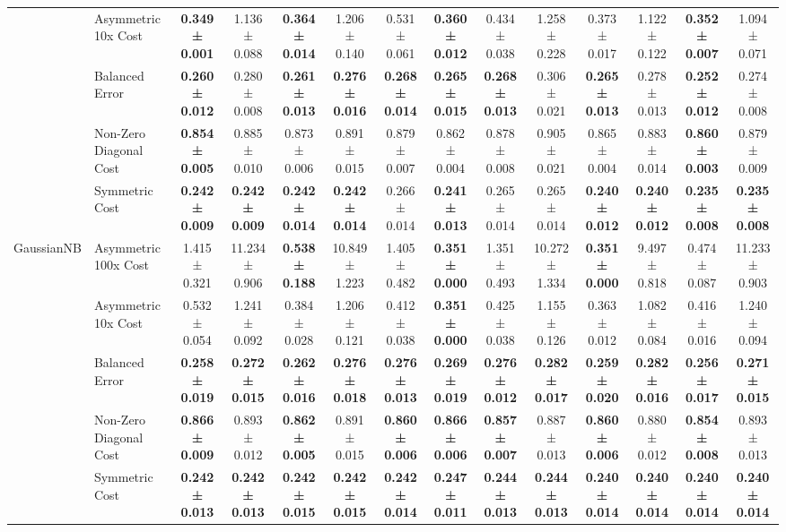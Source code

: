 \begin{table}[H]
{\begin{tabular}{llcccccccccccc}
 & Asymmetric 10x Cost & \textbf{0.349 ± 0.001} & 1.136 ± 0.088 & \textbf{0.364 ± 0.014} & 1.206 ± 0.140 & 0.531 ± 0.061 & \textbf{0.360 ± 0.012} & 0.434 ± 0.038 & 1.258 ± 0.228 & 0.373 ± 0.017 & 1.122 ± 0.122 & \textbf{0.352 ± 0.007} & 1.094 ± 0.071 \\
 & Balanced Error & \textbf{0.260 ± 0.012} & 0.280 ± 0.008 & \textbf{0.261 ± 0.013} & \textbf{0.276 ± 0.016} & \textbf{0.268 ± 0.014} & \textbf{0.265 ± 0.015} & \textbf{0.268 ± 0.013} & 0.306 ± 0.021 & \textbf{0.265 ± 0.013} & 0.278 ± 0.013 & \textbf{0.252 ± 0.012} & 0.274 ± 0.008 \\
 & Non-Zero Diagonal Cost & \textbf{0.854 ± 0.005} & 0.885 ± 0.010 & 0.873 ± 0.006 & 0.891 ± 0.015 & 0.879 ± 0.007 & 0.862 ± 0.004 & 0.878 ± 0.008 & 0.905 ± 0.021 & 0.865 ± 0.004 & 0.883 ± 0.014 & \textbf{0.860 ± 0.003} & 0.879 ± 0.009 \\
 & Symmetric Cost & \textbf{0.242 ± 0.009} & \textbf{0.242 ± 0.009} & \textbf{0.242 ± 0.014} & \textbf{0.242 ± 0.014} & 0.266 ± 0.014 & \textbf{0.241 ± 0.013} & 0.265 ± 0.014 & 0.265 ± 0.014 & \textbf{0.240 ± 0.012} & \textbf{0.240 ± 0.012} & \textbf{0.235 ± 0.008} & \textbf{0.235 ± 0.008} \\
\cline{1-14}
\multirow[t]{5}{*}{GaussianNB} & Asymmetric 100x Cost & 1.415 ± 0.321 & 11.234 ± 0.906 & \textbf{0.538 ± 0.188} & 10.849 ± 1.223 & 1.405 ± 0.482 & \textbf{0.351 ± 0.000} & 1.351 ± 0.493 & 10.272 ± 1.334 & \textbf{0.351 ± 0.000} & 9.497 ± 0.818 & 0.474 ± 0.087 & 11.233 ± 0.903 \\
 & Asymmetric 10x Cost & 0.532 ± 0.054 & 1.241 ± 0.092 & 0.384 ± 0.028 & 1.206 ± 0.121 & 0.412 ± 0.038 & \textbf{0.351 ± 0.000} & 0.425 ± 0.038 & 1.155 ± 0.126 & 0.363 ± 0.012 & 1.082 ± 0.084 & 0.416 ± 0.016 & 1.240 ± 0.094 \\
 & Balanced Error & \textbf{0.258 ± 0.019} & \textbf{0.272 ± 0.015} & \textbf{0.262 ± 0.016} & \textbf{0.276 ± 0.018} & \textbf{0.276 ± 0.013} & \textbf{0.269 ± 0.019} & \textbf{0.276 ± 0.012} & \textbf{0.282 ± 0.017} & \textbf{0.259 ± 0.020} & \textbf{0.282 ± 0.016} & \textbf{0.256 ± 0.017} & \textbf{0.271 ± 0.015} \\
 & Non-Zero Diagonal Cost & \textbf{0.866 ± 0.009} & 0.893 ± 0.012 & \textbf{0.862 ± 0.005} & 0.891 ± 0.015 & \textbf{0.860 ± 0.006} & \textbf{0.866 ± 0.006} & \textbf{0.857 ± 0.007} & 0.887 ± 0.013 & \textbf{0.860 ± 0.006} & 0.880 ± 0.012 & \textbf{0.854 ± 0.008} & 0.893 ± 0.013 \\
 & Symmetric Cost & \textbf{0.242 ± 0.013} & \textbf{0.242 ± 0.013} & \textbf{0.242 ± 0.015} & \textbf{0.242 ± 0.015} & \textbf{0.242 ± 0.014} & \textbf{0.247 ± 0.011} & \textbf{0.244 ± 0.013} & \textbf{0.244 ± 0.013} & \textbf{0.240 ± 0.014} & \textbf{0.240 ± 0.014} & \textbf{0.240 ± 0.014} & \textbf{0.240 ± 0.014} \\

\end{tabular}}
\end{table}
